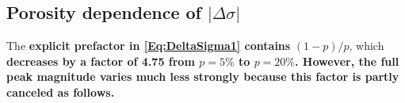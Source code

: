 \documentclass[preprint,12pt,sort&compress]{elsarticle}
\newcommand{\?}{\stackrel{?}{=}}
\providecommand{\DIFaddtex}[1]{{\bf #1}} %
\providecommand{\DIFdeltex}[1]{} %
\providecommand{\DIFaddbegin}{\protect\color{blue}} %
\providecommand{\DIFaddend}{\protect\color{black}} %
\providecommand{\DIFdelbegin}{\protect\color{red}} %
\providecommand{\DIFdelend}{\protect\color{black}} %
\providecommand{\DIFadd}[1]{\texorpdfstring{\DIFaddtex{#1}}{#1}} %
\providecommand{\DIFdel}[1]{\texorpdfstring{\DIFdeltex{#1}}{}} %
\begin{document}
\DIFaddend \subsection{\DIFdelbegin \DIFdel{Consequence for the porosity }\DIFdelend \DIFaddbegin \DIFadd{Porosity }\DIFaddend dependence of \DIFdelbegin %
\DIFdelend \DIFaddbegin \texorpdfstring{$|\Delta\sigma|$}{|Delta sigma|}\DIFaddend }
\label{App:Tpeak:Porosity}

The \DIFdelbegin \DIFdel{prefactor of \cref{Eq:DeltaSigma1} contains the factor }\DIFdelend \DIFaddbegin \DIFadd{explicit prefactor in \cref{Eq:DeltaSigma1} contains }\DIFaddend $(1-p)/p$, which \DIFdelbegin \DIFdel{varies by nearly $4.75\times$ between $p = 5\%$ and $p = 20\%$. Yet the peak $|\Delta \sigma|$ varies far more weakly (\cref{Fig:p_w_plot}).
This subsection explains why.
}\DIFdelend \DIFaddbegin \DIFadd{decreases by a factor of 4.75 from $p=5\%$ to $p=20\%$. However, the full peak magnitude varies much less strongly because this factor is partly canceled as follows.
}\DIFaddend 
\end{document}
